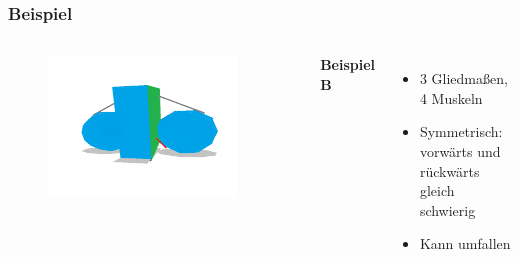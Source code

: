 \documentclass{beamer}
\begin{document}
\begin{frame}
	\frametitle{Beispiel}
	\begin{columns}
		\begin{figure}
			\includegraphics[width=0.9\textwidth]{img/type2.png}
		\end{figure}
		\textbf{Beispiel B}\\
		\begin{itemize}
			\item 3 Gliedmaßen, 4 Muskeln
			\item Symmetrisch: vorwärts und rückwärts gleich schwierig
			\item Kann umfallen
		\end{itemize}		
	\end{columns}	
\end{frame}
\end{document}
